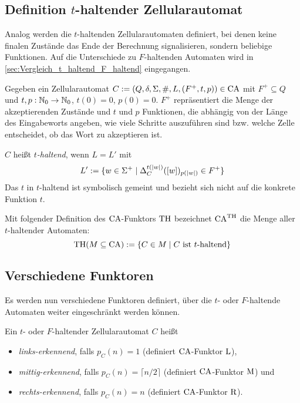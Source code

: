 \subsection{Definition \texorpdfstring{$t$}{t}-haltender Zellularautomat}

Analog werden die $t$-haltenden Zellularautomaten definiert, bei denen keine finalen Zustände das Ende der Berechnung signalisieren,
sondern beliebige Funktionen. Auf die Unterschiede zu $F$-haltenden Automaten wird in \cref{sec:Vergleich_t_haltend_F_haltend} eingegangen.

\begin{definition}
    Gegeben ein Zellularautomat $C := (Q, \delta, \Sigma, \#, L, (F^+, t, p)) \in \textrm{CA}$
    mit $F^+ \subseteq Q$ und $t, p: \mathbb{N}_0 \to \mathbb{N}_0$, $t(0) = 0$, $p(0) = 0$.
    $F^+$ repräsentiert die Menge der akzeptierenden Zustände und $t$ und $p$ Funktionen,
    die abhängig von der Länge des Eingabeworts angeben,
    wie viele Schritte auszuführen sind \acs{bzw.} welche Zelle entscheidet, ob das Wort zu akzeptieren ist.
    
    $C$ heißt \emph{$t$-haltend}, wenn $L = L'$ mit
    \[
        L' := \{ { w \in \Sigma^+ } \; | \; { \Delta_C^{t(|w|)}([w])_{p(|w|)} \in F^+ } \}
    \]
    Das $t$ in $t$-haltend ist symbolisch gemeint und bezieht sich nicht auf die konkrete Funktion $t$.

    Mit folgender Definition des $\textrm{CA}$-Funktors $\textrm{TH}$ bezeichnet $\textrm{CA}^{\textrm{TH}}$ die Menge aller $t$-haltender Automaten:
    \[
        \textrm{TH}(M \subseteq \textrm{CA}) := \{ { C \in M } \; | \; { C \text{ ist $t$-haltend} } \}
    \]
\end{definition}



\subsection{Verschiedene Funktoren}

Es werden nun verschiedene Funktoren definiert, über die $t$- oder $F$-haltende Automaten weiter eingeschränkt werden können.

\begin{definition}
    Ein $t$- oder $F$-haltender Zellularautomat $C$ heißt
    \begin{itemize}
        \item \emph{links-erkennend}, falls $p_C(n) = 1$ (definiert $\textrm{CA}$-Funktor $\textrm{L}$),
        \item \emph{mittig-erkennend}, falls $p_C(n) = \lceil n / 2 \rceil$ (definiert $\textrm{CA}$-Funktor $\textrm{M}$) und
        \item \emph{rechts-erkennend}, falls $p_C(n) = n$ (definiert $\textrm{CA}$-Funktor $\textrm{R}$).
    \end{itemize}
\end{definition}


